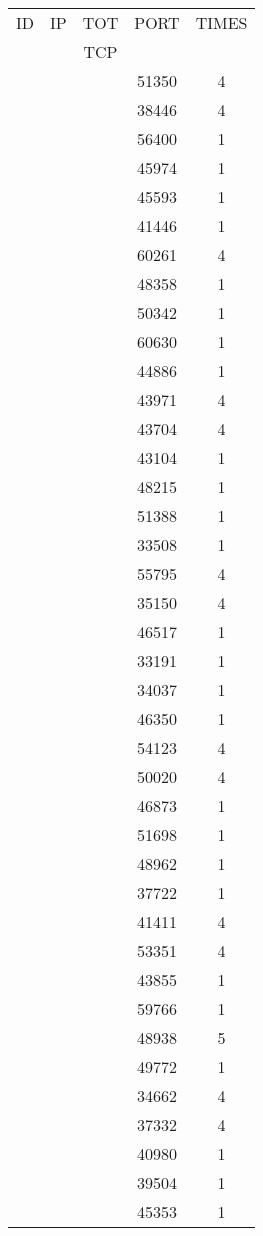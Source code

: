 \documentclass[a4paper]{scrartcl}
\begin{document}
\begin{minipage}[b]{0.5\linewidth}
\begin{tabular}{| c | c | c | c | c |}
\hline
ID & IP & TOT & PORT & TIMES \\ 
   &    & TCP &      &       \\ 
\hline
& & & 51350 & 4 \\ & & & 38446 & 4 \\ & & & 56400 & 1 \\ & & & 45974 & 1 \\ & & & 45593 & 1 \\ & & & 41446 & 1 \\ & & & 60261 & 4 \\ & & & 48358 & 1 \\ & & & 50342 & 1 \\ & & & 60630 & 1 \\ & & & 44886 & 1 \\ & & & 43971 & 4 \\ & & & 43704 & 4 \\ & & & 43104 & 1 \\ & & & 48215 & 1 \\ & & & 51388 & 1 \\ & & & 33508 & 1 \\ & & & 55795 & 4 \\ & & & 35150 & 4 \\ & & & 46517 & 1 \\ & & & 33191 & 1 \\ & & & 34037 & 1 \\ & & & 46350 & 1 \\ & & & 54123 & 4 \\ & & & 50020 & 4 \\ & & & 46873 & 1 \\ & & & 51698 & 1 \\ & & & 48962 & 1 \\ & & & 37722 & 1 \\ & & & 41411 & 4 \\ & & & 53351 & 4 \\ & & & 43855 & 1 \\ & & & 59766 & 1 \\ & & & 48938 & 5 \\ & & & 49772 & 1 \\ & & & 34662 & 4 \\ & & & 37332 & 4 \\ & & & 40980 & 1 \\ & & & 39504 & 1 \\ & & & 45353 & 1 \\ \hline\end{tabular}\end{minipage} \hfill\begin{minipage}[b]{0.5\linewidth}\begin{tabular}{| c | c | c | c | c |}

\end{tabular}
\end{minipage}
\end{document}
